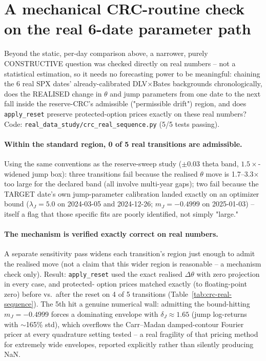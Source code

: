 \section{A mechanical CRC-routine check on the real 6-date parameter path}
\label{sec:crc-real-sequence}

Beyond the static, per-day comparison above, a narrower, purely
CONSTRUCTIVE question was checked directly on real numbers -- not a
statistical estimation, so it needs no forecasting power to be meaningful:
chaining the 6 real SPX dates' already-calibrated DLV$\times$Bates
backgrounds chronologically, does the REALISED change in $\theta$ and jump
parameters from one date to the next fall inside the reserve-CRC's
admissible ("permissible drift") region, and does \texttt{apply\_reset}
preserve protected-option prices exactly on these real numbers? Code:
\texttt{real\_data\_study/crc\_real\_sequence.py} (5/5 tests passing).

\paragraph{Within the standard region, 0 of 5 real transitions are
admissible.} Using the same conventions as the reserve-sweep study
($\pm0.03$ theta band, $1.5\times$-widened jump box): three transitions
fail because the realised $\theta$ move is 1.7--3.3$\times$ too large for
the declared band (all involve multi-year gaps); two fail because the
TARGET date's own jump-parameter calibration landed exactly on an
optimizer bound ($\lambda_J=5.0$ on 2024-03-05 and 2024-12-26;
$m_J=-0.4999$ on 2025-01-03) -- itself a flag that those specific fits are
poorly identified, not simply "large."

\paragraph{The mechanism is verified exactly correct on real numbers.} A
separate sensitivity pass widens each transition's region just enough to
admit the realised move (not a claim that this wider region is reasonable
-- a mechanism check only). Result: \texttt{apply\_reset} used the exact
realised $\Delta\theta$ with zero projection in every case, and protected-
option prices matched exactly (to floating-point zero) before vs.\ after
the reset on 4 of 5 transitions (Table~\ref{tab:crc-real-sequence}). The
5th hit a genuine numerical wall: admitting the bound-hitting $m_J=-0.4999$
forces a dominating envelope with $\delta_J\approx1.65$ (jump log-returns
with $\sim$165\% std), which overflows the Carr--Madan damped-contour
Fourier pricer at every quadrature setting tested -- a real fragility of
that pricing method for extremely wide envelopes, reported explicitly
rather than silently producing NaN.

